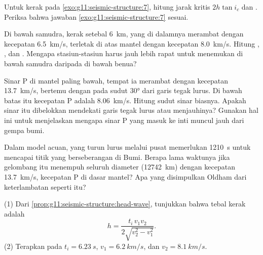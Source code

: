 \begin{exercise}[$\star\star$]\label{exo:g11:seismic-structure:8}
Untuk kerak pada \cref{exo:g11:seismic-structure:7}, hitung jarak kritis
$2h\tan i_c$ dan . Periksa bahwa jawaban
\cref{exo:g11:seismic-structure:7} sesuai.
\end{exercise}

\begin{exercise}[$\star\star$]\label{exo:g11:seismic-structure:9}
Di bawah samudra, kerak setebal \qty{6}{km}, yang di dalamnya 
merambat dengan kecepatan \qty{6.5}{km/s}, terletak di atas mantel dengan
kecepatan \qty{8.0}{km/s}. Hitung , , dan . Mengapa stasiun-stasiun harus jauh lebih rapat untuk menemukan  di
bawah samudra daripada di bawah benua?
\end{exercise}

\begin{exercise}[$\star\star$]\label{exo:g11:seismic-structure:10}
Sinar P di mantel paling bawah, tempat ia merambat dengan kecepatan
\qty{13.7}{km/s}, bertemu dengan  pada sudut \ang{30} dari
garis tegak lurus. Di bawah batas itu kecepatan P adalah \qty{8.06}{km/s}.
Hitung sudut sinar biasnya. Apakah sinar itu dibelokkan mendekati garis tegak
lurus atau menjauhinya? Gunakan hal ini untuk menjelaskan mengapa sinar P yang
masuk ke inti muncul jauh dari gempa bumi.
\end{exercise}

\begin{exercise}[$\star\star$]\label{exo:g11:seismic-structure:11}
Dalam model acuan,  yang turun lurus melalui pusat memerlukan
\qty{1210}{s} untuk mencapai titik yang berseberangan di Bumi. Berapa lama
waktunya jika gelombang itu menempuh seluruh diameter (\qty{12742}{km}) dengan
kecepatan \qty{13.7}{km/s}, kecepatan P di dasar mantel? Apa yang disimpulkan
Oldham dari keterlambatan seperti itu?
\end{exercise}

\begin{exercise}[$\star\star\star$]\label{exo:g11:seismic-structure:12}
(1) Dari \cref{prop:g11:seismic-structure:head-wave}, tunjukkan bahwa tebal
kerak adalah
\[
  h = \frac{t_i\,v_1 v_2}{2\sqrt{v_2^2 - v_1^2}}.
\]
(2) Terapkan pada $t_i = \qty{6.23}{s}$, $v_1 = \qty{6.2}{km/s}$, dan
$v_2 = \qty{8.1}{km/s}$.
\end{exercise}

